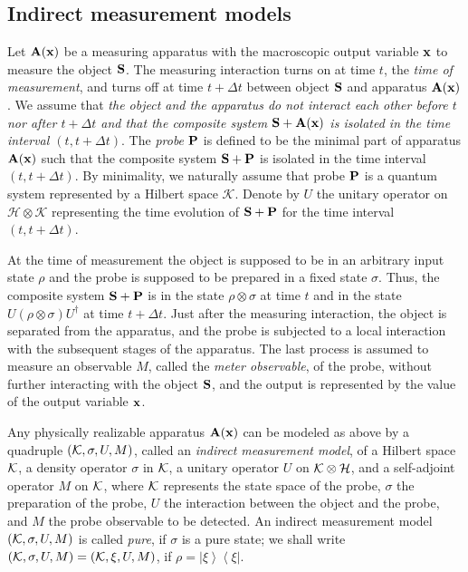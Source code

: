 \documentclass[12pt]{article}
\newcommand{\bA}{{\bf A}}
\newcommand{\bP}{{\bf P}}
\newcommand{\bS}{{\bf S}}
\newcommand{\cH}{{\mathcal H}}
\newcommand{\cK}{{\mathcal K}}
\newcommand{\da}{\dagger}
\newcommand{\rh}{\rho}
\newcommand{\si}{\sigma}
\newcommand{\De}{\Delta}
\newcommand{\bx}{{\bf x}}
\newcommand{\bra}[1]{\left\langle#1\right|}
\newcommand{\ket}[1]{\left|#1\right\rangle}
\begin{document}
\subsection{Indirect measurement models}

Let $\bA(\bx)$ be a measuring apparatus with the macroscopic 
output variable $\bx$ to measure the object $\bS$.  
The measuring
interaction turns on at time $t$, the {\em time of measurement}, and turns off at
time $t+\De t$ between  object $\bS$ and apparatus $\bA(\bx)$.  
We assume that {\em the object and the apparatus do not 
interact each other before $t$ nor after $t+\De t$ and that 
the composite system $\bS+\bA(\bx)$ is isolated in the
time interval $(t,t+\De t)$}.  The {\em probe} $\bP$ is
defined to be the minimal part of apparatus $\bA(\bx)$ 
such that the composite system $\bS+\bP$ is isolated in the time interval
$(t,t+\De t)$. By minimality, we naturally assume that probe $\bP$ is a 
quantum system represented by a Hilbert space $\cK$.  
Denote by $U$ the unitary operator on $\cH\otimes\cK$ representing 
the time evolution of $\bS+\bP$ for the time interval $(t,t+\Delta t)$.  

At the time of measurement the object is supposed to
be in an arbitrary input state $\rh$
and the probe is
supposed to be prepared in a fixed state $\si$.
Thus, the composite system $\bS+\bP$ is in the state $\rh\otimes\si$
at time $t$ and in the state $U(\rh\otimes\si)U^{\da}$ at time $t+\De t$. 
Just after the measuring interaction, the object is separated from the apparatus,
and the probe is subjected to a local interaction with the subsequent stages of the
apparatus.  The last process is assumed to measure an observable $M$, called the
{\em meter observable}, of the probe, without further interacting with the object $\bS$,
and the output is represented by the value of the output variable $\bx$.  

\sloppy
Any physically realizable apparatus $\bA(\bx)$
can be modeled as above by a quadruple
$({\cal K},\si,U,M)$, called an {\em indirect measurement model}, 
of a Hilbert space
${\cal K}$,  a density operator $\si$ in ${\cal K}$, 
a unitary operator $U$ on ${\cal K}\otimes{\cal H}$,
and a self-adjoint operator $M$ on ${\cal K}$, where
${\cal K}$ represents the state space of the probe,
$\si$ the preparation of the probe,
$U$ the interaction between the object and the probe,
and $M$ the probe observable to be detected.
An indirect measurement model $({\cal K},\si,U,M)$
is called {\em pure}, if $\si$ is a pure state; we shall
write $({\cal K},\si,U,M)=({\cal K},\xi,U,M)$, if
$\rh=\ket{\xi}\bra{\xi}$.
 
\end{document}
